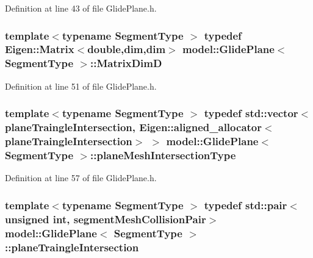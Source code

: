Definition at line 43 of file Glide\+Plane.\+h.

\hypertarget{classmodel_1_1_glide_plane_a2572e44eea5edb4ff9b1dba0d14a18ab}{}
\subsubsection[{Matrix\+Dim\+D}]{\setlength{\rightskip}{0pt plus 5cm}template$<$typename Segment\+Type $>$ typedef Eigen\+::\+Matrix$<$double,{\bf dim},{\bf dim}$>$ {\bf model\+::\+Glide\+Plane}$<$ Segment\+Type $>$\+::{\bf Matrix\+Dim\+D}}\label{classmodel_1_1_glide_plane_a2572e44eea5edb4ff9b1dba0d14a18ab}


Definition at line 51 of file Glide\+Plane.\+h.

\hypertarget{classmodel_1_1_glide_plane_a9e2fb6484e7b28887071b61f99d290bd}{}
\subsubsection[{plane\+Mesh\+Intersection\+Type}]{\setlength{\rightskip}{0pt plus 5cm}template$<$typename Segment\+Type $>$ typedef std\+::vector$<${\bf plane\+Traingle\+Intersection}, Eigen\+::aligned\+\_\+allocator$<${\bf plane\+Traingle\+Intersection}$>$ $>$ {\bf model\+::\+Glide\+Plane}$<$ Segment\+Type $>$\+::{\bf plane\+Mesh\+Intersection\+Type}}\label{classmodel_1_1_glide_plane_a9e2fb6484e7b28887071b61f99d290bd}


Definition at line 57 of file Glide\+Plane.\+h.

\hypertarget{classmodel_1_1_glide_plane_a808d78d8adf1c1a9443d9002889ca08e}{}
\subsubsection[{plane\+Traingle\+Intersection}]{\setlength{\rightskip}{0pt plus 5cm}template$<$typename Segment\+Type $>$ typedef std\+::pair$<$unsigned int, {\bf segment\+Mesh\+Collision\+Pair}$>$ {\bf model\+::\+Glide\+Plane}$<$ Segment\+Type $>$\+::{\bf plane\+Traingle\+Intersection}}\label{classmodel_1_1_glide_plane_a808d78d8adf1c1a9443d9002889ca08e}


